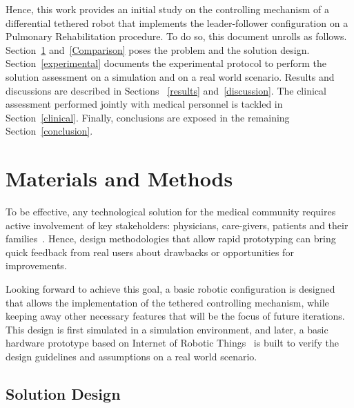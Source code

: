 \documentclass[journal]{IEEEtran}
\begin{document}
Hence, this work provides an initial study on the controlling mechanism of a differential tethered robot that implements the leader-follower configuration on a Pulmonary Rehabilitation procedure.  To do so, this document unrolls as follows.  Section~\ref{materials} and~\ref{Comparison} poses the problem and the solution design. Section~\ref{experimental} documents the experimental protocol to perform the solution assessment on a simulation and on a real world scenario.  Results and discussions are described in Sections ~\ref{results} and~\ref{discussion}. The clinical assessment performed jointly with medical personnel is tackled in Section~\ref{clinical}.  Finally, conclusions are exposed in the remaining Section~\ref{conclusion}.

\section{Materials and Methods}
\label{materials}


To be effective, any technological solution for the medical community requires active involvement of key stakeholders: physicians, care-givers, patients and their families~\cite{Gaggioli2006,Fasola2012,Cherubini2008,Wolpaw2012BraincomputerIP,Salvini2015}.  Hence, design methodologies that allow rapid prototyping can bring quick feedback from real users about drawbacks or opportunities for improvements. 

Looking forward to achieve this goal, a basic robotic configuration is designed that allows the implementation of the  tethered controlling mechanism, while keeping away other necessary features that will be the focus of future iterations.  This design is first simulated in a simulation environment, and later, a basic hardware prototype based on Internet of Robotic Things~\cite{Simoens2018}  is built to verify the design guidelines and assumptions on a real world scenario.


\subsection{Solution Design}
\end{document}
